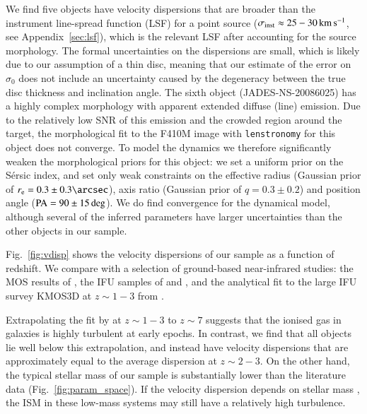 \documentclass[longauth]{aa}
\newcommand{\kms}{\rm km\,s^{-1}}
\begin{document}
We find five objects have velocity dispersions that are broader than the instrument line-spread function (LSF) for a point source ($\sigma_{\rm inst}\approx 25-30\,\kms$, see Appendix~\ref{sec:lsf}), which is the relevant LSF after accounting for the source morphology. The formal uncertainties on the dispersions are small, which is likely due to our assumption of a thin disc, meaning that our estimate of the error on $\sigma_0$ does not include an uncertainty caused by the degeneracy between the true disc thickness and inclination angle. The sixth object (JADES-NS-20086025) has a highly complex morphology with apparent extended diffuse (line) emission. Due to the relatively low SNR of this emission and the crowded region around the target, the morphological fit to the F410M image with \texttt{lenstronomy} for this object does not converge. To model the dynamics we therefore significantly weaken the morphological priors for this object: we set a uniform prior on the S\'ersic index, and set only weak constraints on the effective radius (Gaussian prior of $r_{\rm e}=0.3\pm0.3\arcsec$), axis ratio (Gaussian prior of $q=0.3\pm0.2$) and position angle ($\rm PA=90\pm15\deg$). We do find convergence for the dynamical model, although several of the inferred parameters have larger uncertainties than the other objects in our sample. 


Fig.~\ref{fig:vdisp} shows the velocity dispersions of our sample as a function of redshift. We compare with a selection of ground-based near-infrared studies: the MOS results of \citet[][the medians of their resolved and aligned sample]{Price2020}, the IFU samples of \citet{Turner2017} and \citet{SINS2018}, and the analytical fit to the large IFU survey KMOS3D at $z\sim1-3$ from \citet{Uebler2019}. 

Extrapolating the fit by \citet{Uebler2019} at $z\sim1-3$ to $z\sim 7$ suggests that the ionised gas in galaxies is highly turbulent at early epochs. In contrast, we find that all objects lie well below this extrapolation, and instead have velocity dispersions that are approximately equal to the average dispersion at $z\sim2-3$. On the other hand, the typical stellar mass of our sample is substantially lower than the literature data (Fig.~\ref{fig:param_space}). If the velocity dispersion depends on stellar mass \citep[as predicted by simulations, e.g.][]{Pillepich2019}, the ISM in these low-mass systems may still have a relatively high turbulence.
\end{document}
